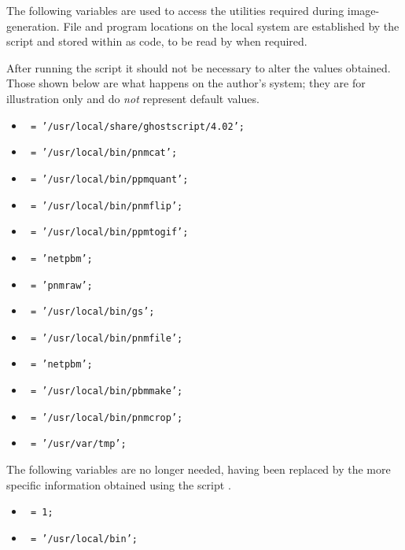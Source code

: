 \begin{changebar}%
\noindent
The following variables are used to access the utilities required during image-generation.
File and program locations on the local system are established by the 
\Perl{} script and stored within  as \Perl{} code,
to be read by  when required.

After running the  \Perl{} script it should not be necessary
to alter the values obtained. Those shown below are what happens on the author's system;
they are for illustration only and do \emph{not} represent default values.
%
\begin{itemize}\label{graphicsutils}%
\item  {}\texttt{ = '/usr/local/share/ghostscript/4.02';}
\item  {}\texttt{ = '/usr/local/bin/pnmcat';}
\item  {}\texttt{ = '/usr/local/bin/ppmquant';}
\item  {}\texttt{ = '/usr/local/bin/pnmflip';}
\item  {}\texttt{ = '/usr/local/bin/ppmtogif';}
\item  {}\texttt{ = 'netpbm';}
\item  {}\texttt{ = 'pnmraw';}
\item  {}\texttt{ = '/usr/local/bin/gs';}
\item  {}\texttt{ = '/usr/local/bin/pnmfile';}
\item  {}\texttt{ = 'netpbm';}
\item  {}\texttt{ = '/usr/local/bin/pbmmake';}
\item  {}\texttt{ = '/usr/local/bin/pnmcrop';}
\item  {}\texttt{ = '/usr/var/tmp';}
\end{itemize}

\noindent
The following variables are no longer needed, having been replaced by the
more specific information obtained using the \Perl{} script .
\begin{itemize}
\item [] \texttt{ = 1;}
\item [] \texttt{ = '/usr/local/bin';}
\end{itemize}\end{changebar}%


